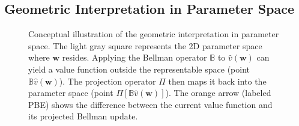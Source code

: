\subsection{Geometric Interpretation in Parameter Space}

\begin{figure}[ht]
\centering
{}
\caption{Conceptual illustration of the geometric interpretation in parameter space. The light gray square represents the 2D parameter space where $\mathbf{w}$ resides. Applying the Bellman operator $\mathbb{B}$ to $\hat{v}(\mathbf{w})$ can yield a value function outside the representable space (point $\mathbb{B}\hat{v}(\mathbf{w})$). The projection operator $\Pi$ then maps it back into the parameter space (point $\Pi[\mathbb{B}\hat{v}(\mathbf{w})]$). The orange arrow (labeled PBE) shows the difference between the current value function and its projected Bellman update.}
\label{fig:param_space}
\end{figure}

